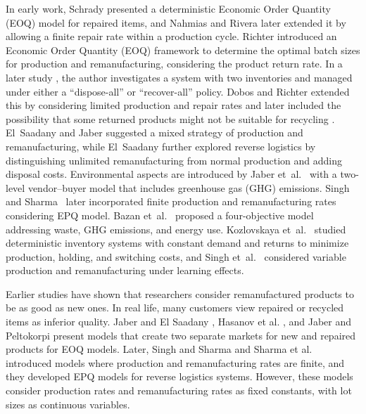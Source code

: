 \documentclass[11pt]{article}
\begin{document}
\noindent In early work, Schrady \cite{Schrady1967} presented a deterministic Economic Order Quantity (EOQ) model for repaired items, and Nahmias and Rivera \cite{Nahmias1979} later extended it by allowing a finite repair rate within a production cycle. 
Richter \cite{Richter1996a, Richter1996b} introduced an Economic Order Quantity (EOQ) framework to determine the optimal batch sizes for production and remanufacturing, considering the product return rate. In a later study \cite{Richter1997}, the author investigates a system with two inventories and managed under either a “dispose-all” or “recover-all” policy.
 Dobos and Richter \cite{Dobos2004} extended this by considering limited production and repair rates and later included the possibility that some returned products might not be suitable for recycling \cite{Dobos2006}.  El~Saadany and Jaber \cite{Saadany2010} suggested a mixed strategy of production and remanufacturing, while El~Saadany \cite{Saadany2013} further explored reverse logistics by distinguishing unlimited remanufacturing from normal production and adding disposal costs. Environmental aspects are introduced by Jaber et~al.\ \cite{Jaber2013a} with a two-level vendor–buyer model that includes greenhouse gas (GHG) emissions. Singh and Sharma\ \cite{Singh2016} later incorporated finite production and remanufacturing rates considering EPQ model. Bazan et~al.\ \cite{Bazan2015, Bazan2016} proposed a four-objective model addressing waste, GHG emissions, and energy use. Kozlovskaya et~al.\ \cite{Kozlovskaya2017} studied deterministic inventory systems with constant demand and returns to minimize production, holding, and switching costs, and Singh et~al.\ \cite{Singh2020} considered variable production and remanufacturing under learning effects.

\noindent Earlier studies have shown that researchers consider remanufactured products to be as good as new ones. In real life, many customers view repaired or recycled items as inferior quality. Jaber and El Saadany \cite{Jaber2009}, Hasanov et al. \cite{Hasanov2012}, and Jaber and Peltokorpi \cite{Jaber2024} present models that create two separate markets for new and repaired products for EOQ models. Later, Singh and Sharma \cite{Singh2016} and Sharma et al. \cite{Swati2021} introduced models where production and remanufacturing rates are finite, and they developed EPQ models for reverse logistics systems. However, these models consider production rates and remanufacturing rates as fixed constants, with lot sizes as continuous variables.
\end{document}
